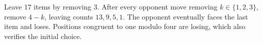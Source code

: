 Leave 17 items by removing $\boxed3$. After every opponent move removing $k\in\{1,2,3\}$, remove $4-k$, leaving counts $13,9,5,1$. The opponent eventually faces the last item and loses. Positions congruent to one modulo four are losing, which also verifies the initial choice.
